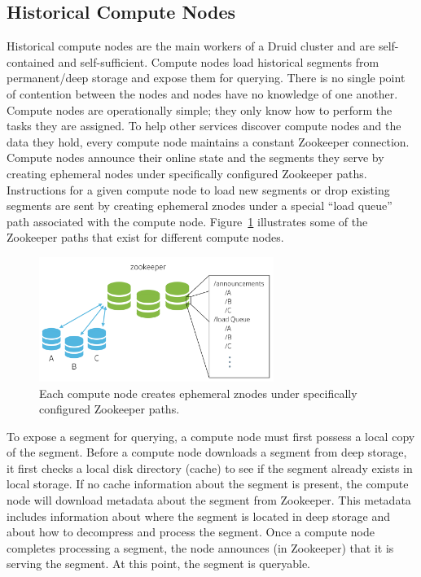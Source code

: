 \documentclass{vldb}
\begin{document}
\subsection{Historical Compute Nodes}
Historical compute nodes are the main workers of a Druid cluster and
are self-contained and self-sufficient. Compute nodes load historical
segments from permanent/deep storage and expose them for
querying. There is no single point of contention between the nodes and
nodes have no knowledge of one another. Compute nodes are
operationally simple; they only know how to perform the tasks they are
assigned. To help other services discover compute nodes and the data
they hold, every compute node maintains a constant Zookeeper
connection. Compute nodes announce their online state and the segments
they serve by creating ephemeral nodes under specifically configured
Zookeeper paths. Instructions for a given compute node to load new
segments or drop existing segments are sent by creating ephemeral
znodes under a special “load queue” path associated with the compute
node. Figure~\ref{fig:zookeeper} illustrates some of the Zookeeper paths that exist
for different compute nodes.

\begin{figure}
\centering
\includegraphics[width = 3in]{zookeeper}
\caption{Each compute node creates ephemeral znodes under specifically configured Zookeeper paths.}
\label{fig:zookeeper}
\end{figure}

To expose a segment for querying, a compute node must first possess a
local copy of the segment. Before a compute node downloads a segment
from deep storage, it first checks a local disk directory (cache) to
see if the segment already exists in local storage. If no cache
information about the segment is present, the compute node will
download metadata about the segment from Zookeeper. This metadata
includes information about where the segment is located in deep
storage and about how to decompress and process the segment. Once a
compute node completes processing a segment, the node announces (in
Zookeeper) that it is serving the segment. At this point, the segment
is queryable.
\end{document}
